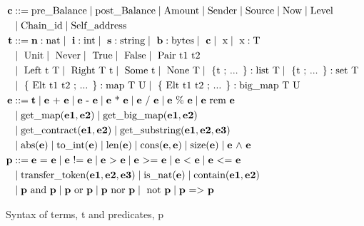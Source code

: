 \documentclass[a4paper,USenglish,cleveref, autoref,anonymous]{lipics-v2021}
\begin{document}
\begin{figure}[tp]
\begin{align*}
\textbf{c} & ::= 
    \text{pre\_Balance}
   \mid \text{post\_Balance}
   \mid \text{Amount}
   \mid \text{Sender}
   \mid \text{Source} 
   \mid \text{Now}
   \mid \text{Level} \\
   &\mid \text{Chain\_id}
   \mid \text{Self\_address}\\
\textbf{t} &::= 
   \textbf{n}: \text{nat}
   \mid\ \textbf{i}: \text{int}
   \mid\  \textbf{s}: \text{string} 
   \mid\  \textbf{b}: \text{bytes}
   \mid\  \textbf{c}  
   \mid\  \text{x} 
   \mid\ \text{x}: \text{T} \\
   &\mid\ \text{Unit} 
   \mid\ \text{Never} 
   \mid\ \text{True} 
   \mid\ \text{False} 
   \mid\ \text{Pair}\ \text{t1 t2} \\
   &\mid\ \text{Left}\ \text{t}\  \text{T}
   \mid\ \text{Right}\ \text{T}\ \text{t}
   \mid\ \text{Some}\ \text{t}
   \mid\ \text{None}\ \text{T} 
   \mid\ \text{\{t ; ... \}}: \text{list T}
   \mid\ \text{\{t ; ... \}}: \text{set T} \\
   &\mid\ \text{\{ Elt t1 t2 ; ... \}}: \text{map T U}
   \mid\ \text{\{ Elt t1 t2 ; ... \}}: \text{big\_map T U} \\
\textbf{e} & :: = \textbf{t}  \mid \textbf{e} \text{ + } \textbf{e}\mid \textbf{e} \text{ - } \textbf{e}  \mid \textbf{e} \text{ * } \textbf{e} \mid \textbf{e} \text{ / } \textbf{e} \mid \textbf{e} \text{ \% } \textbf{e} \mid \textbf{e} \text{ rem } \textbf{e} \\
& 
 \mid \text{get\_map} (\textbf{e1}, \textbf{e2}) 
 \mid \text{get\_big\_map} (\textbf{e1}, \textbf{e2})  \\
 &\mid \text{get\_contract} (\textbf{e1}, \textbf{e2})   
 \mid \text{get\_substring} (\textbf{e1}, \textbf{e2}, \textbf{e3})   \\
& \mid \text{abs} (\textbf{e})  
 \mid \text{to\_int} (\textbf{e})  
 \mid \text{len} (\textbf{e})
 \mid \text{cons} (\textbf{e}, \textbf{e})
 \mid \text{size} (\textbf{e})
\mid \textbf{e} \text{ $\wedge$ } \textbf{e}  \\
\textbf{p} & :: = \textbf{e} \text{ = } \textbf{e}
\mid \textbf{e} \text{ != } \textbf{e}
\mid \textbf{e} \text{ > } \textbf{e}
\mid \textbf{e} \text{ >= } \textbf{e}
\mid \textbf{e} \text{ < } \textbf{e}
\mid \textbf{e} \text{ <= } \textbf{e} \\
& \mid \text{transfer\_token} (\textbf{e1}, \textbf{e2}, \textbf{e3})  
 \mid \text{is\_nat} (\textbf{e})  
 \mid \text{contain} (\textbf{e1}, \textbf{e2}) \\
& \mid \textbf{p} \text{ and } \textbf{p}\mid \textbf{p} \text{ or } \textbf{p}  \mid \textbf{p} \text{ nor } \textbf{p} \mid  \text{ not } \textbf{p} \mid \textbf{p} \text{ => } \textbf{p} \\
\end{align*}
\caption{Syntax of terms, t and predicates, p}
\label{fig:syntax-terms-predicates}
\end{figure}
\end{document}
